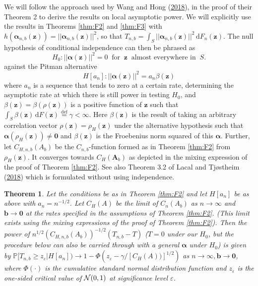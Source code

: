 \documentclass[
  12pt,
  letterpaper]{article}
\newtheorem{thm}{Theorem}[section]
\numberwithin{equation}{section}
\newcommand{\z}{\bm{z}}
\newcommand{\fA}{\bm{A}}
\newcommand{\bb}{\bm{b}}
\newcommand{\falpha}{\bm{\alpha}}
\newcommand{\di}{\,\textrm{d}}
\begin{document}
We will follow the approach used by Wang and Hong (\protect\hyperlink{ref-wang2017characteristic}{2018}), in the proof of their Theorem 2 to derive the results on local asymptotic power. We will explicitly use the results in Theorems \ref{thm:F2} and \ref{thm:F3} with \(h({\falpha}_{n,b}(\z)) = ||{\falpha}_{n,b}(\z)||^2\), so that \(T_{n,b} = \int _S||{\falpha}_{n,b}(\z)||^2 \di F_n(\z)\). The null hypothesis of conditional independence can then be phrased as
\[
H_0: ||{\falpha(\z)}||^2 =  0 \;\; \mbox{for} \;\;\z \;\; \mbox{almost everywhere in} \;\;S. 
\]
against the Pitman alternative
\[
H[a_n]: ||{\falpha(\z)}||^2 = a_n\beta(\z)
\]
where \(a_n\) is a sequence that tends to zero at a certain rate, determining the asymptotic rate at which there is still power in testing \(H_0\), and \(\beta (\z) =\beta(\rho(\z))\) is a positive function of \(\z\) such that \(\int_S \beta(\z) \di F(\z) \stackrel{\textrm{def}}{=} \gamma < \infty\). Here \(\beta(\z)\) is the result of taking an arbitrary correlation vector \(\rho(\z) = \rho_H(\z)\) under the alternative hypothesis such that \({\falpha}(\rho_H(\z)) \neq {\bm{0}}\) and \(\beta(\z)\) is the Froebenius norm squared of this \({\falpha}\). Further, let \(C_{H,n,b}(A_b)\) be the \(C_{n,b}\)-function formed as in Theorem \ref{thm:F2} from \(\rho_H(\z)\). It converges towards \(C_{H}(\fA_b)\) as depicted in the mixing expression of the proof of Theorem \ref{thm:F2}. See also Theorem 3.2 of Lacal and Tjøstheim (\protect\hyperlink{ref-lacal2018estimating}{2018}) which is formulated without using independence.

\begin{thm}
Let the conditions be as in Theorem \ref{thm:F2} and let $H[a_n]$ be as above with $a_n =n^{-1/2}$. Let $C_H(A)$ be the limit of $C_n(A_b)$ as $n \to \infty$ and $\bb \to \bm{0}$ at the rates specified in the assumptions of Theorem \ref{thm:F2}. (This limit exists using the mixing expressions of the proof of Theorem \ref{thm:F2}). Then the power of $n^{1/2}(C_{H,n,b}(A_b))^{-1/2}(T_{n,b}-T)$ ($T = 0$ under our $H_0$, but the procedure below can also be carried through with a general ${\falpha}$ under $H_0$) is given by $\mathbb{P}[T_{n,b} \geq z_{\varepsilon}|H[a_n]) \to 1-\Phi(z_{\varepsilon}-\gamma/[C_{H}(A))]^{1/2})$ as $n \to \infty, \bb \to \bm{0}$, where $\Phi(\cdot)$ is the cumulative standard normal distribution function and $z_{\varepsilon}$ is the one-sided critical value of ${\cal N}(0,1)$ at significance level $\varepsilon$.
\label{thm:G1}
\end{thm}
\end{document}
